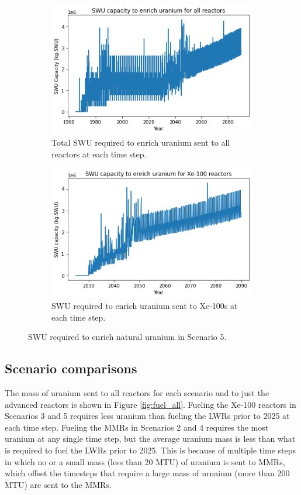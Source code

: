 \begin{figure}
    \centering
    \begin{subfigure}{0.45\textwidth}
        \centering
        \includegraphics[scale=0.4]{../figures/totalswu_scenarios_5.png}
        \caption{Total \gls{SWU} required to enrich uranium sent to all reactors at each time step.}
        \label{fig:totalswu_5}
    \end{subfigure}
    \hspace{0.8cm}
    \begin{subfigure}{0.45\textwidth}
        \centering
        \includegraphics[scale=0.4]{../figures/haleuSWU_scenarios_5.png}
        \caption{\gls{SWU} required to enrich uranium sent to Xe-100s at each time step.}
        \label{fig:haleuswu_5}
    \end{subfigure}
    \caption{\gls{SWU} required to enrich natural uranium in Scenario 5.}
    \label{fig:swu_5}
\end{figure}

\subsection{Scenario comparisons}
The mass of uranium sent to all reactors for each scenario and to just the 
advanced reactors is shown in Figure \ref{fig:fuel_all}. Fueling the Xe-100 
reactors in Scenarios 3 and 5 requires less uranium than fueling the \glspl{LWR}
prior to 2025
at each time step. Fueling the \glspl{MMR} in Scenarios 2 and 4 requires the 
most uranium at any single time step, but the average uranium mass is less 
than what is required to fuel the \glspl{LWR} prior to 2025. This is because 
of multiple time steps in which no or a small mass (less than 20 MTU) 
of uranium is sent to \glspl{MMR}, which offset the timesteps that require 
a large mass of urnaium (more than 200 MTU) are sent to the \glspl{MMR}. 

